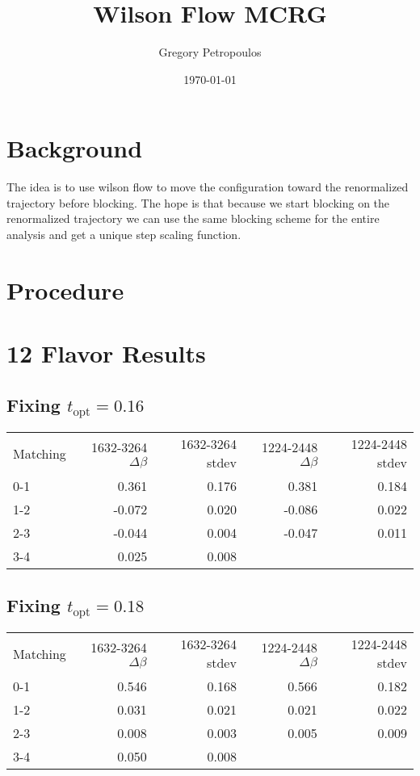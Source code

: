 \documentclass[11pt]{article}
\begin{document}
\title{Wilson Flow MCRG}
\author{Gregory Petropoulos}
\date{\today}
\maketitle

\section{Background}

The idea is to use wilson flow to move the configuration toward the renormalized trajectory before blocking.
The hope is that because we start blocking on the renormalized trajectory we can use the same blocking scheme for the entire analysis and get a unique step scaling function.

\section{Procedure}

\section{12 Flavor Results}
\subsection{Fixing $t_{\text{opt}}=0.16$}
\begin{tabular}{ l | r | r | r | r }
  Matching & 1632-3264 $\Delta\beta$ & 1632-3264 stdev & 1224-2448 $\Delta\beta$ & 1224-2448 stdev \\
       0-1 &  0.361 & 0.176 &  0.381 & 0.184 \\
       1-2 & -0.072 & 0.020 & -0.086 & 0.022 \\
       2-3 & -0.044 & 0.004 & -0.047 & 0.011 \\
       3-4 &  0.025 & 0.008 &  & \\
\end{tabular}

\subsection{Fixing $t_{\text{opt}}=0.18$}
\begin{tabular}{ l | r | r | r | r }
  Matching & 1632-3264 $\Delta\beta$ & 1632-3264 stdev & 1224-2448 $\Delta\beta$ & 1224-2448 stdev \\
       0-1 & 0.546 & 0.168 & 0.566 & 0.182 \\
       1-2 & 0.031 & 0.021 & 0.021 & 0.022 \\
       2-3 & 0.008 & 0.003 & 0.005 & 0.009 \\
       3-4 & 0.050 & 0.008  & & \\
\end{tabular}
\end{document}
